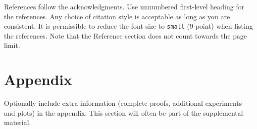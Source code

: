 \documentclass{article}
\begin{document}
References follow the acknowledgments. Use unnumbered first-level heading for
the references. Any choice of citation style is acceptable as long as you are
consistent. It is permissible to reduce the font size to \verb+small+ (9 point)
when listing the references.
Note that the Reference section does not count towards the page limit.
\medskip





\appendix


\section{Appendix}


Optionally include extra information (complete proofs, additional experiments and plots) in the appendix.
This section will often be part of the supplemental material.
\end{document}
